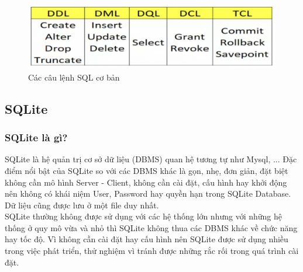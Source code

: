 \begin{figure}[H]
	\centering
	\includegraphics[width=\textwidth]{Images/lệnh SQL.png}
	\vspace{0.5cm}
	\caption{Các câu lệnh SQL cơ bản}
\end{figure}
\subsection{SQLite}
\subsubsection{SQLite là gì?}
\hspace*{.5cm}SQLite là hệ quản trị cơ sở dữ liệu (DBMS) quan hệ tương tự như Mysql,  ... Đặc điểm nổi bật của SQLite so với các DBMS khác là gọn, nhẹ, đơn giản, đặt biệt không cần mô hình Server - Client, không cần cài đặt, cấu hình hay khởi động nên không có khái niệm User, Password hay quyền hạn trong SQLite Database. Dữ liệu cũng được lưu ở một file duy nhất.\\
\hspace*{.5cm} SQLite thường không được sử dụng với các hệ thống lớn nhưng với những hệ thống ở quy mô vừa và nhỏ thì SQLite không thua các DBMS khác về chức năng hay tốc độ. Vì không cần cài đặt hay cấu hình nên SQLite được sử dụng nhiều trong việc phát triển, thử nghiệm vì tránh được những rắc rối trong quá trình cài đặt.

